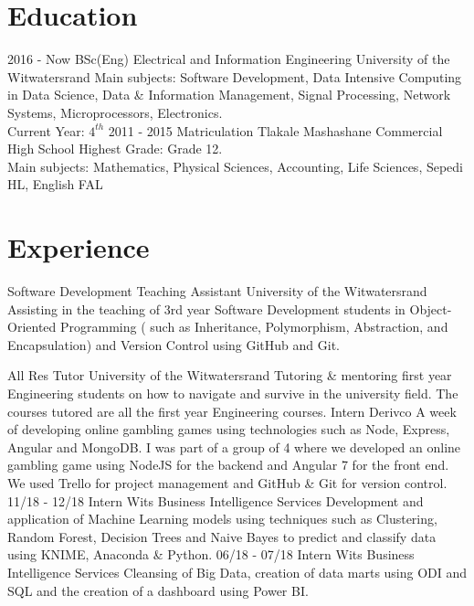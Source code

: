 \documentclass[]{friggeri-cv}
\DeclareRobustCommand{\hlcyan}[1]{{\sethlcolor{cyan}\hl{#1}}}
\begin{document}
\section{Education}
\begin{entrylist}
    \entry
    {2016 - Now}
    { BSc(Eng) Electrical and Information Engineering}
    {University of the Witwatersrand}
    {Main subjects: Software Development, Data Intensive Computing in Data Science, Data \& Information Management, Signal Processing, Network Systems, Microprocessors, Electronics.\\
    Current Year: $4^{th}$}
  \entry
    {2011 - 2015}
    {Matriculation}
    {Tlakale Mashashane Commercial High School }
    {Highest Grade: Grade 12.\\
    Main subjects: Mathematics, Physical Sciences, Accounting, Life Sciences, Sepedi HL, English FAL}
\end{entrylist}

\section{Experience}
\begin{entrylist}
        {Software Development Teaching Assistant}
        {University of the Witwatersrand}
        {Assisting in the teaching of 3rd year Software Development students in Object-Oriented Programming ( such as Inheritance, Polymorphism, Abstraction, and Encapsulation) and Version Control using GitHub and Git. }

        {All Res Tutor}
        {University of the Witwatersrand}
        {Tutoring \& mentoring first year Engineering students on how to navigate and survive in the university field. The courses tutored are all the first year Engineering courses. }
        {Intern}
        {Derivco}
        {A week of developing online gambling games using technologies such as Node, Express, Angular and MongoDB. I was part of a group of 4 where we developed an online gambling game using NodeJS for the backend and Angular 7 for the front end. We used Trello for project management and GitHub \& Git for version control.}
  \entry
    {11/18 - 12/18}%
    {Intern}
    {Wits Business Intelligence Services}
    {Development and application of Machine Learning models using techniques such as Clustering, Random Forest, Decision Trees and Naive Bayes to predict and classify data using KNIME, Anaconda \& Python.}
  \entry
    {06/18 - 07/18}%
    {Intern}
    {Wits Business Intelligence Services}
    {Cleansing of Big Data, creation of data marts using ODI and SQL and the creation of a dashboard using Power BI.}
\end{entrylist}
\end{document}
